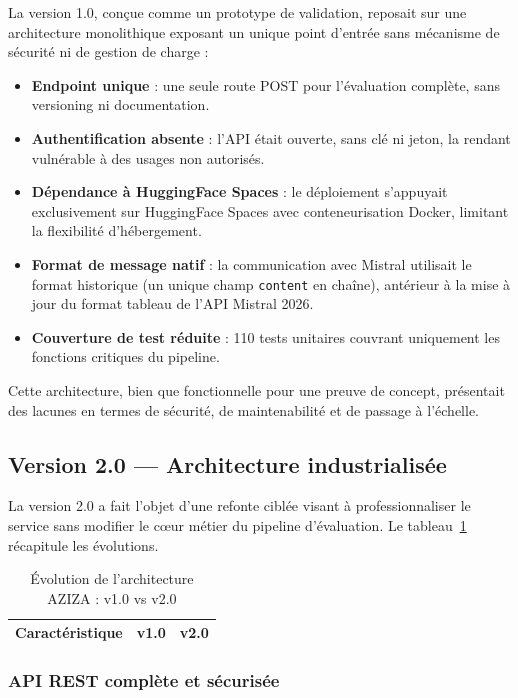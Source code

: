 La version 1.0, conçue comme un prototype de validation, reposait sur une architecture monolithique exposant un unique point d'entrée sans mécanisme de sécurité ni de gestion de charge :

\begin{itemize}
    \item \textbf{Endpoint unique} : une seule route POST pour l'évaluation complète, sans versioning ni documentation.
    \item \textbf{Authentification absente} : l'API était ouverte, sans clé ni jeton, la rendant vulnérable à des usages non autorisés.
    \item \textbf{Dépendance à HuggingFace Spaces} : le déploiement s'appuyait exclusivement sur HuggingFace Spaces avec conteneurisation Docker, limitant la flexibilité d'hébergement.
    \item \textbf{Format de message natif} : la communication avec Mistral utilisait le format historique (un unique champ \texttt{content} en chaîne), antérieur à la mise à jour du format tableau de l'API Mistral 2026.
    \item \textbf{Couverture de test réduite} : 110 tests unitaires couvrant uniquement les fonctions critiques du pipeline.
\end{itemize}

Cette architecture, bien que fonctionnelle pour une preuve de concept, présentait des lacunes en termes de sécurité, de maintenabilité et de passage à l'échelle.

\subsection{Version 2.0 — Architecture industrialisée}

La version 2.0 a fait l'objet d'une refonte ciblée visant à professionnaliser le service sans modifier le cœur métier du pipeline d'évaluation. Le tableau~\ref{tab:evolution-v1-v2} récapitule les évolutions.

\begin{table}[H]
\centering
\small
\renewcommand{\arraystretch}{1.4}
\begin{tabular}{lcc}
\toprule
\textbf{Caractéristique} & \textbf{v1.0} & \textbf{v2.0} \\
\midrule
\end{tabular}
\caption{Évolution de l'architecture AZIZA : v1.0 vs v2.0}
\label{tab:evolution-v1-v2}
\end{table}

\subsubsection{API REST complète et sécurisée}

